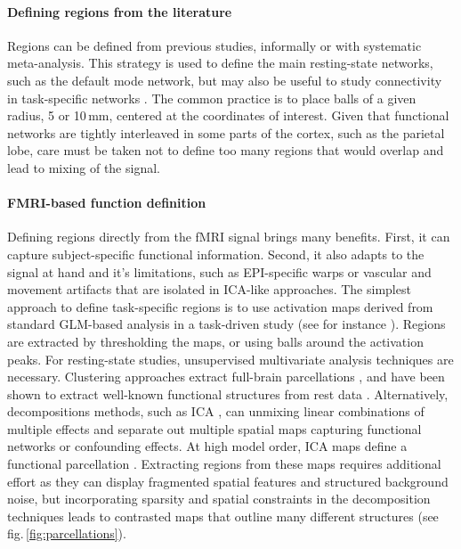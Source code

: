 \documentclass[5p]{elsarticle}
\begin{document}
\paragraph{Defining regions from the literature}
%
Regions can be defined from previous studies, informally or with
systematic meta-analysis. This strategy is used to define the main
resting-state networks, such as the default mode network, but may also be
useful to study connectivity in task-specific networks
\cite{grillon2012}. The common practice is to place balls of a given
radius, 5 or 10\,mm, centered at the coordinates of interest. Given that
functional networks are tightly interleaved in some parts of the cortex,
such as the parietal lobe, care must be taken not to define too many
regions that would overlap and lead to mixing of the signal.

\paragraph{FMRI-based function definition}
%
Defining regions directly from the fMRI signal brings many benefits.
First, it can capture subject-specific functional information. Second, it
also adapts to the signal at hand and it's limitations, such as
EPI-specific warps or vascular and movement artifacts that are isolated
in ICA-like approaches. The simplest approach to define task-specific
regions is to use activation maps derived from standard GLM-based
analysis in a task-driven study (see for instance \cite{poldrack2011}).
Regions are extracted by thresholding the maps, or using balls around the
activation peaks. For resting-state studies, unsupervised multivariate
analysis techniques are necessary. Clustering approaches extract
full-brain parcellations \cite{craddock2011, bellec2010, yeo2011,
thirion2006}, and have been shown to extract well-known functional
structures from rest data \cite{yeo2011}. Alternatively, decompositions
methods, such as ICA \cite{beckmann2004}, can unmixing linear
combinations of multiple effects and separate out multiple spatial maps
capturing functional networks or confounding effects. At high model
order, ICA maps define a functional parcellation \cite{kiviniemi2009}.
Extracting regions from these maps requires additional effort as they can
display fragmented spatial features and structured background noise, but
incorporating sparsity and spatial constraints in the decomposition
techniques leads to contrasted maps that outline many different
structures \cite{varoquaux2012} (see fig.\,\ref{fig:parcellations}).
\end{document}
